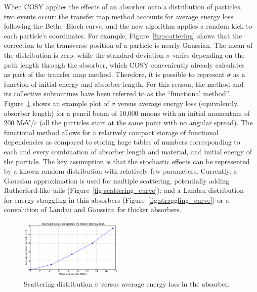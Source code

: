 \documentclass{jacow}
\begin{document}
When COSY applies the effects of an absorber onto a distribution of particles, two events occur: the transfer map method accounts for average energy loss following the Bethe--Bloch curve, and the new algorithm applies a random kick to each particle's coordinates. For example, Figure~\ref{fig:scattering} shows that the correction to the transverse position of a particle is nearly Gaussian. The mean of the distribution is zero, while the standard deviation $\sigma$ varies depending on the path length through the absorber, which COSY conveniently already calculates as part of the transfer map method. Therefore, it is possible to represent $\sigma$ as a function of initial energy and absorber length. For this reason, the method and its collective subroutines have been referred to as the ``functional method''. Figure~\ref{fig:functional} shows an example plot of $\sigma$ versus average energy loss (equivalently, absorber length) for a pencil beam of 10,000 muons with an initial momentum of 200 MeV$/c$ (all the particles start at the same point with no angular spread). The functional method allows for a relatively compact storage of functional dependencies as compared to storing huge tables of numbers corresponding to each and every combination of absorber length and material, and initial energy of the particle. The key assumption is that the stochastic effects can be represented by a known random distribution with relatively few parameters. Currently, a Gaussian approximation is used for multiple scattering, potentially adding Rutherford-like tails (Figure~\ref{fig:scattering_curve}); and a Landau distribution for energy straggling in thin absorbers (Figure~\ref{fig:straggling_curve}) or a convolution of Landau and Gaussian for thicker absorbers.

\begin{figure}[htf]
\centering
\includegraphics[width=0.45\textwidth]{functional.pdf}
\caption{Scattering distribution $\sigma$ versus average energy loss in the absorber.}
\label{fig:functional}
\end{figure}
\end{document}
